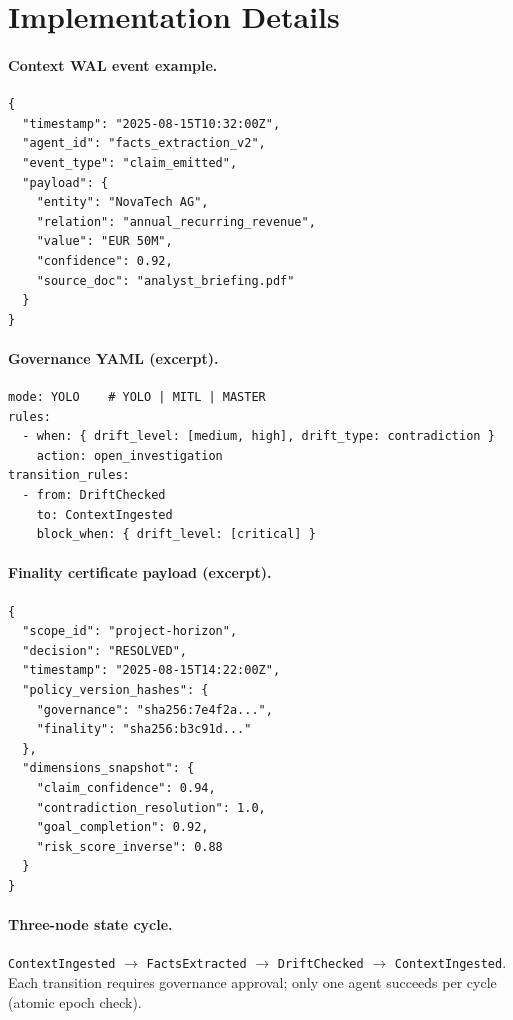 \documentclass[11pt]{article}
\begin{document}



\appendix

\section{Implementation Details}
\label{sec:app-implementation}

\paragraph{Context WAL event example.}
\begin{lstlisting}
{
  "timestamp": "2025-08-15T10:32:00Z",
  "agent_id": "facts_extraction_v2",
  "event_type": "claim_emitted",
  "payload": {
    "entity": "NovaTech AG",
    "relation": "annual_recurring_revenue",
    "value": "EUR 50M",
    "confidence": 0.92,
    "source_doc": "analyst_briefing.pdf"
  }
}
\end{lstlisting}

\paragraph{Governance YAML (excerpt).}
\begin{lstlisting}
mode: YOLO    # YOLO | MITL | MASTER
rules:
  - when: { drift_level: [medium, high], drift_type: contradiction }
    action: open_investigation
transition_rules:
  - from: DriftChecked
    to: ContextIngested
    block_when: { drift_level: [critical] }
\end{lstlisting}

\paragraph{Finality certificate payload (excerpt).}
\begin{lstlisting}
{
  "scope_id": "project-horizon",
  "decision": "RESOLVED",
  "timestamp": "2025-08-15T14:22:00Z",
  "policy_version_hashes": {
    "governance": "sha256:7e4f2a...",
    "finality": "sha256:b3c91d..."
  },
  "dimensions_snapshot": {
    "claim_confidence": 0.94,
    "contradiction_resolution": 1.0,
    "goal_completion": 0.92,
    "risk_score_inverse": 0.88
  }
}
\end{lstlisting}

\paragraph{Three-node state cycle.}
\texttt{ContextIngested} $\to$ \texttt{FactsExtracted} $\to$ \texttt{DriftChecked} $\to$ \texttt{ContextIngested}.
Each transition requires governance approval; only one agent succeeds per cycle (atomic epoch check).
\end{document}
